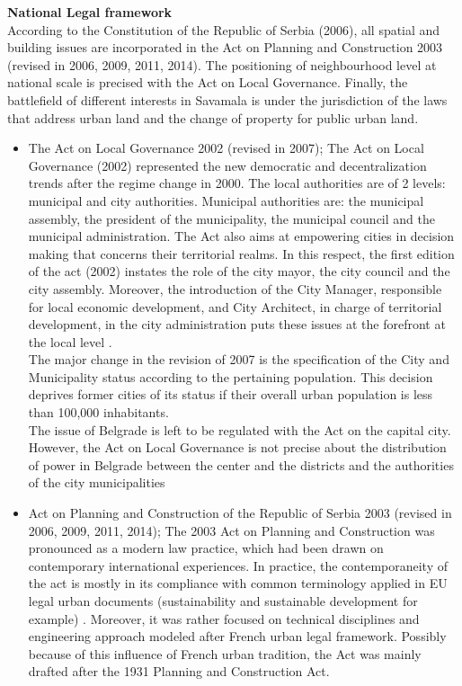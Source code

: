 \documentclass[11pt]{report}
\begin{document}
\textbf{National Legal framework}
\\
According to the Constitution of the Republic of Serbia (2006), all spatial and building issues are incorporated in the Act on Planning and Construction 2003 (revised in 2006, 2009, 2011, 2014). The positioning of neighbourhood level at national scale is precised with the Act on Local Governance. Finally, the battlefield of different interests in Savamala is under the jurisdiction of the laws that address urban land and the change of property for public urban land.
\begin{itemize}
\item The Act on Local Governance 2002 (revised in 2007);
The Act on Local Governance (2002) represented the new democratic and decentralization trends after the regime change in 2000. The local authorities are of 2 levels: municipal and city authorities. Municipal authorities are: the municipal assembly, the president of the municipality, the municipal council and the municipal administration. 
The Act also aims at empowering cities in decision making that concerns their territorial realms. In this respect, the first edition of the act (2002) instates the role of the city mayor, the city council and the city assembly. Moreover, the introduction of the City Manager, responsible for local economic development, and City Architect, in charge of territorial development, in the city administration puts these issues at the forefront at the local level \cite{Vujovic and Petrovic 2007}. 
\\
The major change in the revision of 2007 is the specification of the City and Municipality status according to the pertaining population. This decision deprives former cities of its status if their overall urban population is less than 100,000 inhabitants.\footnotemark
{}
\\
The issue of Belgrade is left to be regulated with the Act on the capital city. However, the Act on Local Governance is not precise about the distribution of power in Belgrade between the center and the districts and the authorities of the city municipalities
\item Act on Planning and Construction of the Republic of Serbia 2003 (revised in 2006, 2009, 2011, 2014);
The 2003 Act on Planning and Construction was pronounced as a modern law practice, which had been drawn on contemporary international experiences. In practice, the contemporaneity of the act is mostly in its compliance with common terminology applied in EU legal urban documents (sustainability and sustainable development for example) \cite{Zakon 2003}. Moreover, it was rather focused on technical disciplines and engineering approach \cite{waves of planning 2006} modeled after French urban legal framework. Possibly because of this influence of French urban tradition, the Act was mainly drafted after the 1931 Planning and Construction Act.

\end{itemize}
\end{document}
